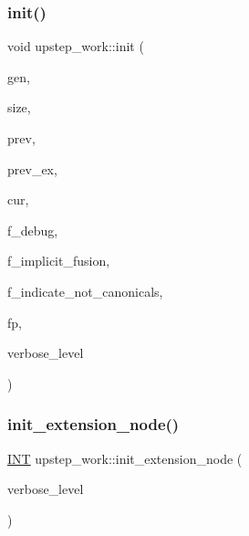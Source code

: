 \subsubsection{\texorpdfstring{init()}{init()}}
{\footnotesize\ttfamily void upstep\+\_\+work\+::init (\begin{DoxyParamCaption}\item[{\mbox{\hyperlink{classgenerator}{generator}} $\ast$}]{gen,  }\item[{\mbox{\hyperlink{galois_8h_a09fddde158a3a20bd2dcadb609de11dc}{I\+NT}}}]{size,  }\item[{\mbox{\hyperlink{galois_8h_a09fddde158a3a20bd2dcadb609de11dc}{I\+NT}}}]{prev,  }\item[{\mbox{\hyperlink{galois_8h_a09fddde158a3a20bd2dcadb609de11dc}{I\+NT}}}]{prev\+\_\+ex,  }\item[{\mbox{\hyperlink{galois_8h_a09fddde158a3a20bd2dcadb609de11dc}{I\+NT}}}]{cur,  }\item[{\mbox{\hyperlink{galois_8h_a09fddde158a3a20bd2dcadb609de11dc}{I\+NT}}}]{f\+\_\+debug,  }\item[{\mbox{\hyperlink{galois_8h_a09fddde158a3a20bd2dcadb609de11dc}{I\+NT}}}]{f\+\_\+implicit\+\_\+fusion,  }\item[{\mbox{\hyperlink{galois_8h_a09fddde158a3a20bd2dcadb609de11dc}{I\+NT}}}]{f\+\_\+indicate\+\_\+not\+\_\+canonicals,  }\item[{F\+I\+LE $\ast$}]{fp,  }\item[{\mbox{\hyperlink{galois_8h_a09fddde158a3a20bd2dcadb609de11dc}{I\+NT}}}]{verbose\+\_\+level }\end{DoxyParamCaption})}

\mbox{\label{classupstep__work_ad74931a4c6dc97102d405a755433297d}} 
\subsubsection{\texorpdfstring{init\+\_\+extension\+\_\+node()}{init\_extension\_node()}}
{\footnotesize\ttfamily \mbox{\hyperlink{galois_8h_a09fddde158a3a20bd2dcadb609de11dc}{I\+NT}} upstep\+\_\+work\+::init\+\_\+extension\+\_\+node (\begin{DoxyParamCaption}\item[{\mbox{\hyperlink{galois_8h_a09fddde158a3a20bd2dcadb609de11dc}{I\+NT}}}]{verbose\+\_\+level }\end{DoxyParamCaption})}

